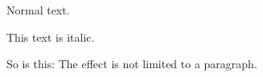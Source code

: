 \documentclass{article}
\begin{document}
	Normal text.
	
	{\itshape
		
		This text is italic.
		
		So is this: The effect is not limited to a paragraph.
	}
\end{document}
